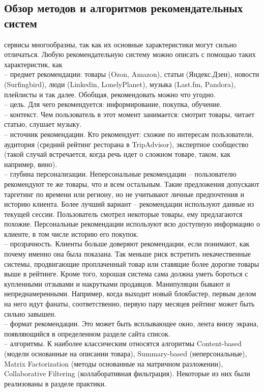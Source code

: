 \documentclass{article}
\newcommand\tab[1][1cm]{\hspace*{#1}}
\begin{document}
\subsection{Обзор методов и алгоритмов рекомендательных систем} 
 сервисы многообразны, так как их основные характеристики могут сильно отличаться. Любую рекомендательную систему можно описать с помощью таких характеристик, как \\
\tab– предмет рекомендации: товары (Ozon, Amazon), статьи (Яндекс.Дзен), новости (Surfingbird), люди (Linkedin, LonelyPlanet), музыка (Last.fm, Pandora), плейлисты и так далее. Обобщая, рекомендовать можно что угодно. \\
\tab– цель. Для чего рекомендуется: информирование, покупка, обучение. \\
\tab– контекст. Чем пользователь в этот момент занимается: смотрит товары, читает статью, слушает музыку. \\
\tab– источник рекомендации. Кто рекомендует: схожие по интересам пользователи, аудитория (средний рейтинг ресторана в TripAdvisor), экспертное сообщество (такой случай встречается, когда речь идет о сложном товаре, таком, как например, вино).\\
\tab– глубина персонализации. Неперсональные рекомендации – пользователю рекомендуют те же товары, что и всем остальным. Такие предложения допускают таргетинг по времени или региону, но не учитывают личные предпочтения и историю клиента. Более лучший вариант – рекомендации используют данные из текущей сессии. Пользователь смотрел некоторые товары, ему предлагаются похожие. Персональные рекомендации используют всю доступную информацию о клиенте, в том числе историю его покупок.\\
\tab– прозрачность. Клиенты больше доверяют рекомендации, если понимают, как почему именно она была показана. Так меньше риск встретить некачественные системы, продвигающие проплаченный товар или ставящие более дорогие товары выше в рейтинге. Кроме того, хорошая система сама должна уметь бороться с купленными отзывами и накрутками продавцов. Манипуляции бывают и непреднамеренными. Например, когда выходит новый блокбастер, первым делом на него идут фанаты, соответственно, первую пару месяцев рейтинг может быть сильно завышен.\\
\tab– формат рекомендации. Это может быть всплывающее окно, лента внизу экрана, появляющийся в определенном разделе сайта список.\\
\tab– алгоритмы. К наиболее классическим относятся алгоритмы Content-based (модели основанные на описании товара), Summary-based (неперсональные), Matrix Factorization (методы основанные на матричном разложении), Collaborative Filtering (коллаборативная фильтрация). Некоторые из них были реализованы в разделе практики.
\newpage
\end{document}
